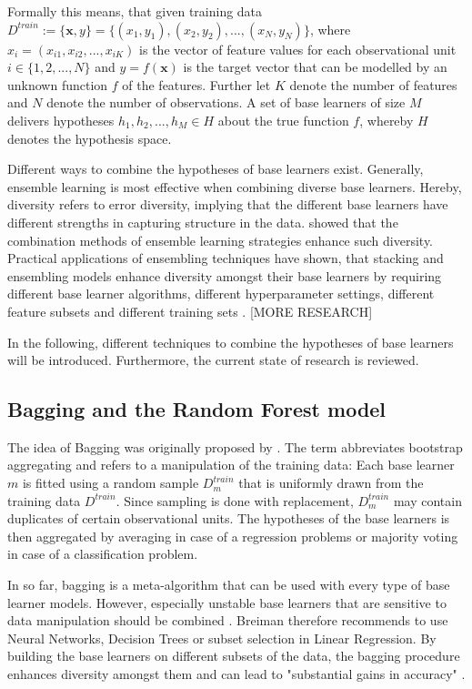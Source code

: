 \documentclass[12pt]{article}
\begin{document}
Formally this means, that given training data $D^{train} := \{\mathbf{x}, y\} = \{(x_1, y_1), (x_2, y_2),..., (x_N, y_N)\}$, where $x_i = (x_{i1}, x_{i2},..., x_{iK})$ is the vector of feature values for each observational unit $i \in \{1, 2,..., N\}$ and $y = f(\mathbf{x})$ is the target vector that can be modelled by an unknown function $f$ of the features. Further let $K$ denote the number of features and $N$ denote the number of observations. A set of base learners of size $M$ delivers hypotheses $h_1, h_2,..., h_M \in H$ about the true function $f$, whereby $H$ denotes the hypothesis space.

Different ways to combine the hypotheses of base learners exist. Generally, ensemble learning is most effective when combining diverse base learners. Hereby, diversity refers to error diversity, implying that the different base learners have different strengths in capturing structure in the data. \cite{brown2005diversity} showed that the combination methods of ensemble learning strategies enhance such diversity. Practical applications of ensembling techniques have shown, that stacking and ensembling models enhance diversity amongst their base learners by requiring different base learner algorithms, different hyperparameter settings, different feature subsets and different training sets \citep{online2017stacking}. [MORE RESEARCH]

In the following, different techniques to combine the hypotheses of base learners will be introduced. Furthermore, the current state of research is reviewed. 

\subsection{Bagging and the Random Forest model}
The idea of Bagging was originally proposed by \cite{breiman1996bagging}. The term abbreviates bootstrap aggregating and refers to a manipulation of the training data: Each base learner $m$ is fitted using a random sample $D^{train}_m$ that is uniformly drawn from the training data $D^{train}$. Since sampling is done with replacement, $D^{train}_m$ may contain duplicates of certain observational units. The hypotheses of the base learners is then aggregated by averaging in case of a regression problems or majority voting in case of a classification problem. 

In so far, bagging is a meta-algorithm that can be used with every type of base learner models. However, especially unstable base learners that are sensitive to data manipulation should be combined \citep[p.124]{breiman1996bagging}. Breiman therefore recommends to use Neural Networks, Decision Trees	or subset selection in Linear Regression. By building the base learners on different subsets of the data, the bagging procedure enhances diversity amongst them and can lead to "substantial gains in accuracy" \citep[p.123]{breiman1996bagging}.
\end{document}
